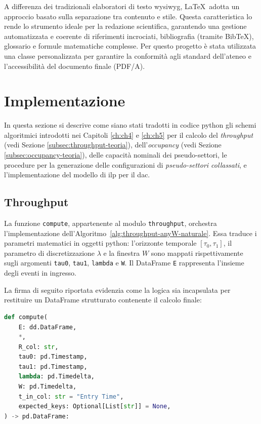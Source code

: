 A differenza dei tradizionali elaboratori di testo \gls{wysiwyg}, \LaTeX\ adotta un approccio basato sulla separazione tra contenuto e stile. Questa caratteristica lo rende lo strumento ideale per la redazione scientifica, garantendo una gestione automatizzata e coerente di riferimenti incrociati, bibliografia (tramite Bib\TeX), glossario e formule matematiche complesse.
Per questo progetto è stata utilizzata una classe personalizzata per garantire la conformità agli standard dell'ateneo e l'accessibilità del documento finale (PDF/A).

\section{Implementazione}
In questa sezione si descrive come siano stati tradotti in codice \gls{python} gli schemi algoritmici introdotti nei Capitoli \ref{ch:ch4} e \ref{ch:ch5} per il calcolo del \emph{throughput} (vedi Sezione \ref{subsec:throughput-teoria}), dell'\emph{occupancy} (vedi Sezione \ref{subsec:occupancy-teoria}), delle capacità nominali dei pseudo-settori, le procedure per la generazione delle configurazioni di \emph{pseudo-settori collassati}, e l’implementazione del modello di \gls{ilp} per il \gls{dac}.

\subsection{Throughput}
La funzione \texttt{compute}, appartenente al modulo \texttt{throughput}, orchestra l'implementazione dell'Algoritmo~\ref{alg:throughput-anyW-naturale}. Essa traduce i parametri matematici in oggetti \gls{python}: l'orizzonte temporale $[\tau_0, \tau_1]$, il parametro di discretizzazione $\lambda$ e la finestra $W$ sono mappati rispettivamente sugli argomenti \texttt{tau0}, \texttt{tau1}, \texttt{lambda} e \texttt{W}. Il DataFrame \texttt{E} rappresenta l'insieme degli eventi in ingresso.

La firma di seguito riportata evidenzia come la logica sia incapsulata per restituire un DataFrame strutturato contenente il calcolo finale:

\begin{lstlisting}[language=Python, caption={}]
def compute(
    E: dd.DataFrame,
    *,
    R_col: str,
    tau0: pd.Timestamp,
    tau1: pd.Timestamp,
    lambda: pd.Timedelta,
    W: pd.Timedelta,
    t_in_col: str = "Entry Time",
    expected_keys: Optional[List[str]] = None,
) -> pd.DataFrame:
\end{lstlisting}

